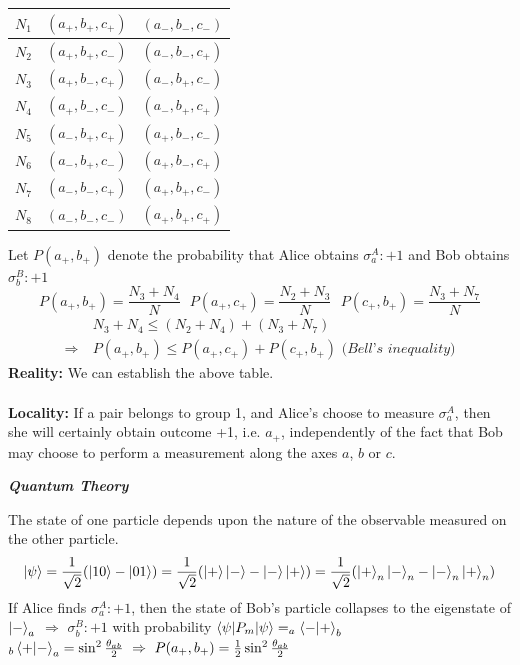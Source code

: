 \documentclass[]{book}
\theoremstyle{nonumberplain}
\begin{document}
\begin{itemize}
\begin{center}
\begin{tabular}{|c|c|c|}
	\hline 
	$N_{1}$ & $(a_{+},b_{+},c_{+})$ & $(a_{-},b_{-},c_{-})$ \\
	\hline 
	$N_{2}$ & $(a_{+},b_{+},c_{-})$ & $(a_{-},b_{-},c_{+})$ \\
	\hline 
	$N_{3}$ & $(a_{+},b_{-},c_{+})$ & $(a_{-},b_{+},c_{-})$ \\
	\hline 
	$N_{4}$ & $(a_{+},b_{-},c_{-})$ & $(a_{-},b_{+},c_{+})$ \\
	\hline 
	$N_{5}$ & $(a_{-},b_{+},c_{+})$ & $(a_{+},b_{-},c_{-})$ \\
	\hline 
	$N_{6}$ & $(a_{-},b_{+},c_{-})$ & $(a_{+},b_{-},c_{+})$ \\
	\hline 
	$N_{7}$ & $(a_{-},b_{-},c_{+})$ & $(a_{+},b_{+},c_{-})$ \\
	\hline 
	$N_{8}$ & $(a_{-},b_{-},c_{-})$ & $(a_{+},b_{+},c_{+})$ \\
	\hline
\end{tabular}
\end{center}
Let $P(a_{+},b_{+})$ denote the probability that Alice obtains $\sigma^{A}_{a}:+1$ and Bob obtains $\sigma^{B}_{b}:+1$
\[
	P(a_{+},b_{+}) = \frac{N_{3}+N_{4}}{N} \ \ \ P(a_{+},c_{+}) = \frac{N_{2}+N_{3}}{N} \ \ \ P(c_{+},b_{+}) = \frac{N_{3}+N_{7}}{N} 
\] 
\begin{equation*}
\begin{aligned}
	& N_{3}+N_{4} \leq (N_{2}+N_{4}) + (N_{3}+N_{7}) \\ 
	\Rightarrow\ & P(a_{+},b_{+}) \leq P(a_{+},c_{+}) + P(c_{+},b_{+}) \textit{\ \ (Bell's inequality)}
\end{aligned}
\end{equation*}
\textbf{Reality:} We can establish the above table. \\ \\
\textbf{Locality:}
If a pair belongs to group 1, and Alice's choose to measure $\sigma^{A}_{a}$, then she will certainly obtain outcome +1, i.e. $a_{+}$, independently of the fact that Bob may choose to perform a measurement along the axes $a$, $b$ or $c$. \\
\begin{center}
\textit{\textbf{Quantum Theory}}
\end{center}
The state of one particle depends upon the nature of the observable measured on the other particle.
\[
	\ket{\psi} = \frac{1}{\sqrt{2}}(\ket{10}-\ket{01}) = \frac{1}{\sqrt{2}}(\ket{+}\ket{-}-\ket{-}\ket{+})  = \frac{1}{\sqrt{2}}(\ket{+}_{n}\ket{-}_{n}-\ket{-}_{n}\ket{+}_{n}) 
\] 
If Alice finds $\sigma^{A}_{a}:+1$, then the state of Bob's particle collapses to the eigenstate of $\ket{-}_{a}$ $\Rightarrow$ $\sigma^{B}_{b}:+1$ with probability $\braket{\psi|P_{m}|\psi} = _{a}\braket{-|+}_{b}$ $_{b}\braket{+|-}_{a}=\sin^{2}{\frac{\theta_{ab}}{2}}\ \Rightarrow\ P(a_{+},b_{+})=\frac{1}{2}\sin^{2}{\frac{\theta_{ab}}{2}}$ 

\end{itemize}
\end{document}
